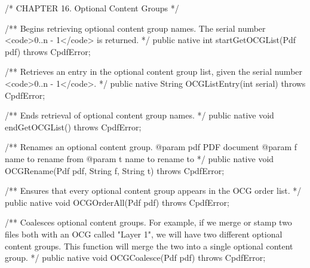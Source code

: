 /* CHAPTER 16. Optional Content Groups */

/** Begins retrieving optional content group names. The serial number
<code>0..n - 1</code> is returned. */
public native int startGetOCGList(Pdf pdf) throws CpdfError;

/** Retrieves an entry in the optional content group list, given the serial
number <code>0..n - 1</code>. */
public native String OCGListEntry(int serial) throws CpdfError;

/** Ends retrieval of optional content group names. */
public native void endGetOCGList() throws CpdfError;

/** Renames an optional content group.
@param pdf PDF document
@param f name to rename from
@param t name to rename to */
public native void OCGRename(Pdf pdf, String f, String t) throws CpdfError;

/** Ensures that every optional content group appears in the OCG order
list. */
public native void OCGOrderAll(Pdf pdf) throws CpdfError;

/** Coalesces optional content groups. For example, if we merge or stamp
two files both with an OCG called "Layer 1", we will have two different
optional content groups. This function will merge the two into a single
optional content group. */
public native void OCGCoalesce(Pdf pdf) throws CpdfError;
